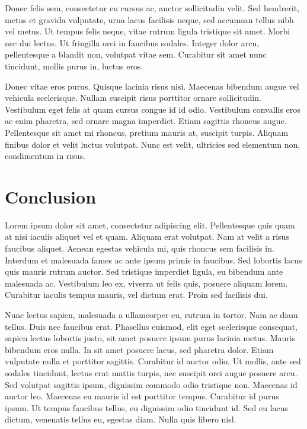 \documentclass{UoYCSproject}
\begin{document}
Donec felis sem, consectetur eu cursus ac, auctor sollicitudin
velit. Sed hendrerit, metus et gravida vulputate, urna lacus facilisis
neque, sed accumsan tellus nibh vel metus. Ut tempus felis neque,
vitae rutrum ligula tristique sit amet. Morbi nec dui lectus. Ut
fringilla orci in faucibus sodales. Integer dolor arcu, pellentesque a
blandit non, volutpat vitae sem. Curabitur sit amet nunc tincidunt,
mollis purus in, luctus eros.

Donec vitae eros purus. Quisque lacinia risus nisi. Maecenas bibendum
augue vel vehicula scelerisque. Nullam suscipit risus porttitor ornare
sollicitudin. Vestibulum eget felis at quam cursus congue id id
odio. Vestibulum convallis eros ac enim pharetra, sed ornare magna
imperdiet. Etiam sagittis rhoncus augue. Pellentesque sit amet mi
rhoncus, pretium mauris at, suscipit turpis. Aliquam finibus dolor et
velit luctus volutpat. Nunc est velit, ultricies sed elementum non,
condimentum in risus.


\chapter{Conclusion}
\label{cha:conclusion}
Lorem ipsum dolor sit amet, consectetur adipiscing elit. Pellentesque
quis quam at nisi iaculis aliquet vel et quam. Aliquam erat
volutpat. Nam at velit a risus faucibus aliquet. Aenean egestas
vehicula mi, quis rhoncus sem facilisis in. Interdum et malesuada
fames ac ante ipsum primis in faucibus. Sed lobortis lacus quis mauris
rutrum auctor. Sed tristique imperdiet ligula, eu bibendum ante
malesuada ac. Vestibulum leo ex, viverra ut felis quis, posuere
aliquam lorem. Curabitur iaculis tempus mauris, vel dictum erat. Proin
sed facilisis dui.

Nunc lectus sapien, malesuada a ullamcorper eu, rutrum in tortor. Nam
ac diam tellus. Duis nec faucibus erat. Phasellus euismod, elit eget
scelerisque consequat, sapien lectus lobortis justo, sit amet posuere
ipsum purus lacinia metus. Mauris bibendum eros nulla. In sit amet
posuere lacus, sed pharetra dolor. Etiam vulputate nulla et porttitor
sagittis. Curabitur id auctor odio. Ut mollis, ante sed sodales
tincidunt, lectus erat mattis turpis, nec suscipit orci augue posuere
arcu. Sed volutpat sagittis ipsum, dignissim commodo odio tristique
non. Maecenas id auctor leo. Maecenas eu mauris id est porttitor
tempus. Curabitur id purus ipsum. Ut tempus faucibus tellus, eu
dignissim odio tincidunt id. Sed eu lacus dictum, venenatis tellus eu,
egestas diam. Nulla quis libero nisl.
\end{document}
